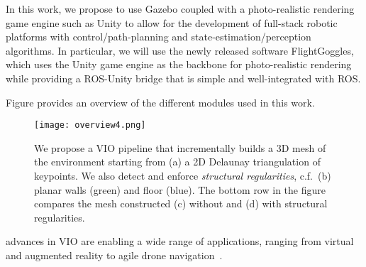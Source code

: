 In this work, we propose to use Gazebo coupled with a photo-realistic rendering game engine such as Unity to allow for the development of full-stack robotic platforms with control/path-planning and state-estimation/perception algorithms.
In particular, we will use the newly released software FlightGoggles, which uses the Unity game engine as the backbone for photo-realistic rendering while providing a ROS-Unity bridge that is simple and well-integrated with ROS.

Figure  provides an overview of the different modules used in this work.

\begin{figure}[t]
  \centering
  \texttt{[image: overview4.png]}
  \caption{We propose a VIO pipeline that incrementally builds a 3D mesh of the environment starting from (a) a 2D Delaunay triangulation of keypoints. We also detect and enforce \emph{structural regularities}, c.f.~(b) planar walls (green) and floor (blue). The bottom row in the figure compares the mesh constructed
  (c) without and (d) with structural regularities.\vspace{-5mm}}
  \label{fig:intro}
\end{figure}

  advances in VIO are enabling a wide range of applications, ranging from
 virtual and augmented reality to agile drone navigation~\cite{SayreMcCord18icra}.

